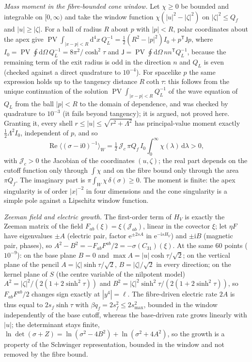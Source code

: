 \emph{Mass moment in the fibre-bounded cone window.} Let \(\chi\ge0\) be bounded and integrable on \([0,\infty)\) and take the window function \(\chi(|u|^2-|\zeta|^2)\) on \(|\zeta|^2\le Q_f\) and \(|u|\ge|\zeta|\). For a ball of radius \(R\) about \(p\) with \(|p|<R\), polar coordinates about the apex give \(\operatorname{PV}\!\int_{|x-p|<R}\mathrm d^4x\,Q_L^{-1}=\tfrac12(R^2-|p|^2)I_0+p^{\mathsf T}\mathsf Jp\), where \(I_0=\operatorname{PV}\oint\mathrm d\Omega\,Q_L^{-1}=8\pi^2/\cosh^2\tau\) and \(\mathsf J=\operatorname{PV}\oint\mathrm d\Omega\,nn^{\mathsf T}Q_L^{-1}\), because the remaining term of the exit radius is odd in the direction \(n\) and \(Q_L\) is even (checked against a direct quadrature to \(10^{-4}\)). For spacelike \(p\) the same expression holds up to the tangency distance \(R\coth\tau\): this follows from the unique continuation of the solution \(\operatorname{PV}\!\int_{|x-p|<R}Q_L^{-1}\) of the wave equation of \(Q_L\) from the ball \(|p|<R\) to the domain of dependence, and was checked by quadrature to \(10^{-3}\) (it fails beyond tangency); it is argued, not proved here. Granting it, every shell \(r\le|u|\le\sqrt{r^2+\Lambda^2}\) has principal-value moment exactly \(\tfrac12\Lambda^2I_0\), independent of \(p\), and so
\[
  \operatorname{Re}\langle(\sigma-\mathrm i0)^{-1}\rangle_W=\tfrac12\,\mathcal J_c\,\pi Q_f\,I_0\int_0^\infty\chi(\lambda)\,\mathrm d\lambda>0 ,
\]
with \(\mathcal J_c>0\) the Jacobian of the coordinates \((u,\zeta)\); the real part depends on the cutoff function only through \(\int\chi\) and on the fibre bound only through the area \(\pi Q_f\). The imaginary part is \(\pi\int_W\chi\,\delta(\sigma)\ge0\). The moment is finite: the apex singularity is of order \(|x|^{-2}\) in four dimensions and the cone singularity is a simple pole against a Lipschitz window function.

\emph{Zeeman field and electric growth.} The first-order term of \(H_V\) is exactly the Zeeman matrix of the field \(F_{ab}(\xi)=\xi(\mathcal J_{ab})\), linear in the covector \(\xi\); let \(\eta F\) have eigenvalues \(\pm A\) (electric pair, factor \(\mathrm e^{\pm2sA}\) in \(\mathrm e^{-\mathrm isH_V}\)) and \(\pm\mathrm iB\) (magnetic pair, phases), so \(A^2-B^2=-F_{ab}F^{ab}/2=-\sigma(C_{31})(\xi)\). At the same \(60\) points (\(10^{-9}\)): on the base plane \(B=0\) and \(\max A=|u|\cosh\tau/\sqrt2\); on the vertical plane of the pencil \(A=|\zeta|\sinh\tau/\sqrt2\), \(B=|\zeta|/\sqrt2\) in every direction; on the kernel plane of \(S\) (the centre variable of the nilpotent model) \(A^2=|\zeta|^2/(2(1+2\sinh^2\tau))\) and \(B^2=|\zeta|^2\sinh^2\tau/(2(1+2\sinh^2\tau))\), so \(F_{ab}F^{ab}/2\) changes sign exactly at \(|y^4|=\ell\). The fibre-driven electric rate \(2A\) is thus equal to \(2s_f\sinh\tau\) with \(\beta q_f=2s_f^2\le2s_{\max}^2\), bounded in the window independently of the base cutoff, whereas the base-driven rate grows linearly with \(|u|\); the determinant stays finite, \(\ln\det(\sigma+Z)=\ln(\sigma^2-4B^2)+\ln(\sigma^2+4A^2)\), so the growth is a property of the Schwinger representation, bounded in the window and not removed by the fibre bound.

